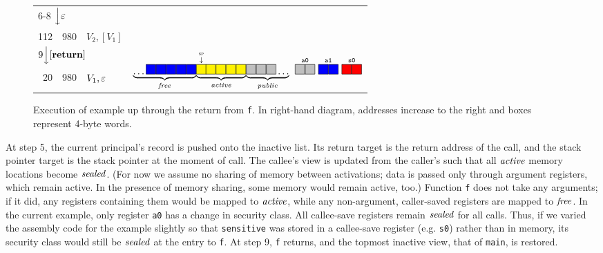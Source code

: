 \documentclass[10pt,conference]{ieeetran}%
\theoremstyle{definition}
\begin{document}
\begin{figure}
\begin{tabular}{|r|r||l|r}
    \cline{1-3}
    \multicolumn{3}{l}{\multirow{2}{*}{6-8 \(\Big\downarrow \varepsilon\)}} \\ \multicolumn{3}{l}{} \\
    \cline{1-3}
    112 & 980 & \(V_2,[V_1]\) \\
    \cline{1-3}
    \multicolumn{3}{l}{\multirow{2}{*}{\(9 \Big\downarrow [\mathbf{return}]\)}} & \\
    \multicolumn{3}{l}{} & \multirow{3}{*}{\(\underbrace{\dots \freebox \freebox \freebox \freebox \freebox}_\unsealed
      \! \underbrace{\stackrel{\stackrel{\SP}{\downarrow}}{\objbox} \!\! \objbox \objbox \objbox \objbox}_\object
      \! \underbrace{\pubbox \pubbox \pubbox \dots}_\public
      ~ \stackrel{\mathtt{a0}}{\pubbox\pubbox} ~ \stackrel{\mathtt{a1}}{\freebox\freebox}
      ~ \stackrel{\mathtt{s0}}{\sealbox\sealbox}
      \)}
    \\
    \cline{1-3}
    20 & 980  & \(V_1, \varepsilon\) &
    \\
    \cline{1-3}
    \multicolumn{2}{l}{} \\
  \end{tabular}
  \caption{Execution of example up through the return from {\tt f}. In right-hand diagram, addresses increase to the right and
  boxes represent 4-byte words.}
\label{fig:exec1}
\end{figure}
%
At step 5, the current principal's record is pushed onto the inactive list.
Its return target is the return address of the call,
and the stack pointer target is the stack pointer at the moment of call.
The callee's view is updated from the caller's such that all \(\mathit{active}\) memory locations
become \(\mathit{sealed}\). (For now we assume no sharing of memory between activations; data is
passed only through argument registers, which remain active. In the presence of memory
sharing, some memory would remain active, too.)
Function {\tt f} does not take any arguments; if it did, any registers containing them would be 
mapped to \(\mathit{active}\), while any non-argument, caller-saved 
registers are mapped to \(\mathit{free}\). In the current example, only register {\tt a0} has a change in
security class. All callee-save registers remain \(\mathit{sealed}\) for all calls.
Thus, if we varied the assembly code for the example slightly so that {\tt sensitive} was stored
in a callee-save register (e.g. {\tt s0}) rather than in memory, its security class would still be \(\mathit{sealed}\)
at the entry to {\tt f}.
%
At step 9, {\tt f} returns, and the topmost inactive view, that of {\tt main}, is restored.
\end{document}
